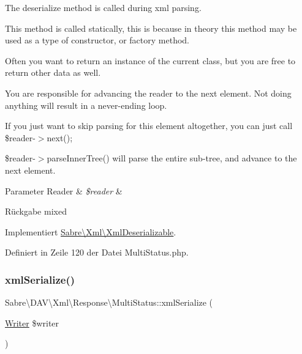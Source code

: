 The deserialize method is called during xml parsing.

This method is called statically, this is because in theory this method may be used as a type of constructor, or factory method.

Often you want to return an instance of the current class, but you are free to return other data as well.

You are responsible for advancing the reader to the next element. Not doing anything will result in a never-\/ending loop.

If you just want to skip parsing for this element altogether, you can just call \$reader-\/$>$next();

\$reader-\/$>$parse\+Inner\+Tree() will parse the entire sub-\/tree, and advance to the next element.


\begin{DoxyParams}[1]{Parameter}
Reader & {\em \$reader} & \\
\hline
\end{DoxyParams}
\begin{DoxyReturn}{Rückgabe}
mixed 
\end{DoxyReturn}


Implementiert \mbox{\hyperlink{interface_sabre_1_1_xml_1_1_xml_deserializable_a19e0eca545b9a0d93f7d6b69085ade30}{Sabre\textbackslash{}\+Xml\textbackslash{}\+Xml\+Deserializable}}.



Definiert in Zeile 120 der Datei Multi\+Status.\+php.

\mbox{\label{class_sabre_1_1_d_a_v_1_1_xml_1_1_response_1_1_multi_status_a91767722f4c127274426027cc6006d18}} 
\subsubsection{\texorpdfstring{xml\+Serialize()}{xmlSerialize()}}
{\footnotesize\ttfamily Sabre\textbackslash{}\+D\+A\+V\textbackslash{}\+Xml\textbackslash{}\+Response\textbackslash{}\+Multi\+Status\+::xml\+Serialize (\begin{DoxyParamCaption}\item[{\mbox{\hyperlink{class_sabre_1_1_xml_1_1_writer}{Writer}}}]{\$writer }\end{DoxyParamCaption})}

